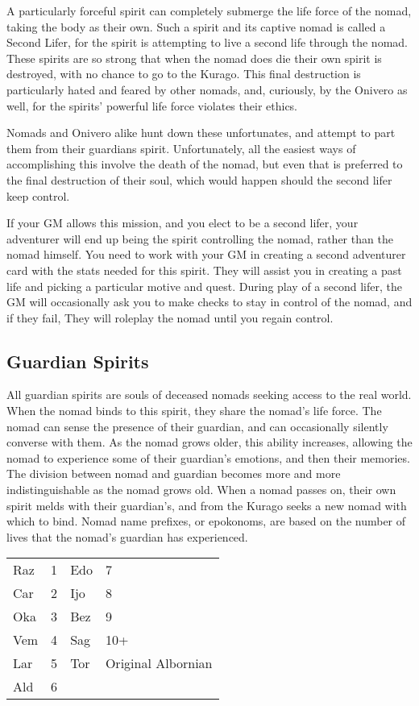 A particularly forceful spirit can completely submerge the life force of the nomad, taking the body as their own. Such a spirit and its captive nomad is called a Second Lifer, for the spirit is attempting to live a second life through the nomad. These spirits are so strong that when the nomad does die their own spirit is destroyed, with no chance to go to the Kurago. This final destruction is particularly hated and feared by other nomads, and, curiously, by the Onivero as well, for the spirits' powerful life force violates their ethics.

Nomads and Onivero alike hunt down these unfortunates, and attempt to part them from their guardians spirit. Unfortunately, all the easiest ways of accomplishing this involve the death of the nomad, but even that is preferred to the final destruction of their soul, which would happen should the second lifer keep control.

If your GM allows this mission, and you elect to be a second lifer, your adventurer will end up being the spirit controlling the nomad, rather than the nomad himself. You need to work with your GM in creating a second adventurer card with the stats needed for this spirit. They will assist you in creating a past life and picking a particular motive and quest. During play of a second lifer, the GM will occasionally ask you to make checks to stay in control of the nomad, and if they fail, They will roleplay the nomad until you regain control.

\subsection{Guardian Spirits}

All guardian spirits are souls of deceased nomads seeking access to the real world. When the nomad binds to this spirit, they share the nomad's life force. The nomad can sense the presence of their guardian, and can occasionally silently converse with them. As the nomad grows older, this ability increases, allowing the nomad to experience some of their guardian's emotions, and then their memories. The division between nomad and guardian becomes more and more indistinguishable as the nomad grows old. When a nomad passes on, their own spirit melds with their guardian's, and from the Kurago seeks a new nomad with which to bind. Nomad name prefixes, or epokonoms, are based on the number of lives that the nomad's guardian has experienced.

\begin{normbox}
\small
\begin{tabular}{@{}l l l l}
Raz &1&Edo &7\\
Car &2&Ijo &8\\
Oka &3&Bez &9\\
Vem &4&Sag & 10+\\
Lar &5&Tor & Original Albornian\\
Ald &6&&\\
\end{tabular}
\end{normbox}

